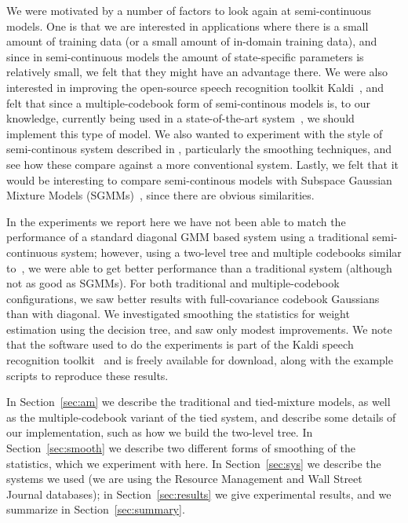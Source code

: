 \documentclass{article}
\begin{document}
We were motivated by a number of factors to look again at semi-continuous models.
One is that we are interested in applications where there is a small amount
of training data (or a small amount of in-domain training data), and since
in semi-continuous models the amount of state-specific parameters is relatively
small, we felt that they might have an advantage there.  We were also interested
in improving the open-source speech recognition toolkit {\sc Kaldi}~\cite{povey2011tks},
and felt that since a multiple-codebook form of semi-continous models is, to
our knowledge, currently being used in a state-of-the-art system~\cite{prasad2004t2b},
we should implement this type of model.  We also wanted to experiment with
the style of semi-continous system described 
in \cite{schukattalamazzini1994srf,schukattalamazzini1995as}, particularly the smoothing
techniques, and see how these compare against a more conventional system.
Lastly, we felt that it would be interesting to compare semi-continous
models with Subspace Gaussian Mixture Models (SGMMs)~\cite{povey2011sgm}, since
there are obvious similarities.

In the experiments we report here we have not been able to match the performance of
a standard diagonal GMM based system using a traditional semi-continuous system;
however, using a two-level tree and multiple codebooks similar to~\cite{prasad2004t2b},
we were able to get better performance than a traditional system (although not
as good as SGMMs).  For both traditional and multiple-codebook configurations,
we saw better results with full-covariance codebook Gaussians than with diagonal.
We investigated smoothing the statistics for weight estimation using the decision
tree, and saw only modest improvements.
We note that the software used to do the experiments is part of the {\sc Kaldi} speech
recognition toolkit~\cite{povey2011tks} and is freely available for download, along with the
example scripts to reproduce these results.

In Section~\ref{sec:am} we describe the traditional and tied-mixture models,
as well as the multiple-codebook variant of the tied system, and describe some
details of our implementation, such as how we build the two-level tree.
In Section~\ref{sec:smooth} we describe two different forms of smoothing of the statistics,
which we experiment with here.  
In Section~\ref{sec:sys} we describe the systems we used (we are using
the Resource Management and Wall Street Journal databases);
in Section~\ref{sec:results} we give experimental results, and we
summarize in Section~\ref{sec:summary}.
\end{document}
